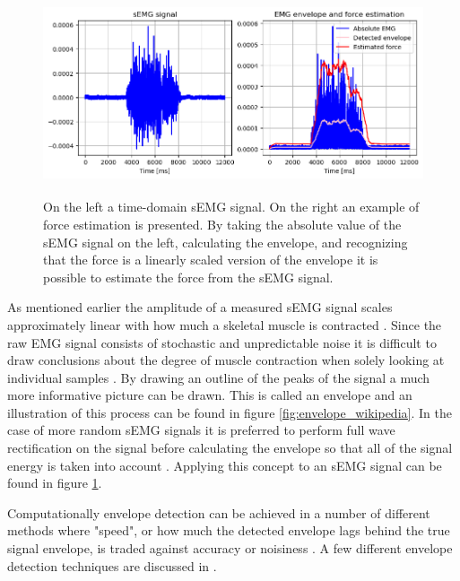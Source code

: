 \begin{figure}[h!t]
	\begin{center}
		\includegraphics[height=60mm]{images/amplitude_force_estimation_example.png}
	\end{center}
	\caption{On the left a time-domain sEMG signal. On the right an example of force estimation is presented. By taking the absolute value of the sEMG signal on the left, calculating the envelope, and recognizing that the force is a linearly scaled version of the envelope it is possible to estimate the force from the sEMG signal.}
	\label{fig:amplitude_estimation_example}
\end{figure}

As mentioned earlier the amplitude of a measured sEMG signal scales approximately linear with how much a skeletal muscle is contracted \cite{adaptive_filter_dry_electrode}. Since the raw EMG signal consists of stochastic and unpredictable noise it is difficult to draw conclusions about the degree of muscle contraction when solely looking at individual samples \cite{semg_signals_analysis_and_applications}. By drawing an outline of the peaks of the signal a much more informative picture can be drawn. This is called an envelope and an illustration of this process can be found in figure \ref{fig:envelope_wikipedia}. In the case of more random sEMG signals it is preferred to perform full wave rectification on the signal before calculating the envelope so that all of the signal energy is taken into account \cite{semg_signals_analysis_and_applications}. Applying this concept to an sEMG signal can be found in figure \ref{fig:amplitude_estimation_example}.

Computationally envelope detection can be achieved in a number of different methods where "speed", or how much the detected envelope lags behind the true signal envelope, is traded against accuracy or noisiness \cite{dsp_good_bad_ugly}. A few different envelope detection techniques are discussed in \cite{rose2011electromyogram}.

